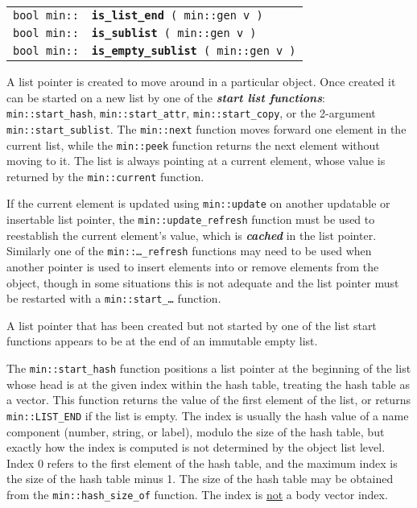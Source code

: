 \documentclass[12pt]{article}
\makeatletter
\newcommand{\skey}[2]{{\bf \em #1#2}\index{#1}}
\newcommand{\ikey}[2]{{\bf \em #1}\index{#2}}
\newcommand{\ttindex}[1]{\index{#1@{\tt #1}}}
\newcommand{\minindex}[1]{\ttindex{min::#1}\ttindex{#1}}
\newcommand{\EOL}{\penalty \exhyphenpenalty}
\newenvironment{indpar}[1][0.3in]%
	{\begin{list}{}%
		     {\setlength{\itemsep}{0in}%
		      \setlength{\topsep}{0in}%
		      \setlength{\parsep}{1ex}%
		      \setlength{\labelwidth}{#1}%
		      \setlength{\leftmargin}{#1}%
		      \addtolength{\leftmargin}{\labelsep}}%
	 \item}%
	{\end{list}}
\newcommand{\LABEL}[1]{\label{#1}}
\newcommand{\MINKEY}[1]{{\tt \bf #1}\minindex{#1}}
\makeatother
\begin{document}
\begin{indpar}\begin{tabular}{r@{}l}
\verb|bool min::|
	& \MINKEY{is\_list\_end}\verb| ( min::gen v )|
\LABEL{MIN::IS_LIST_END} \\
\verb|bool min::|
	& \MINKEY{is\_sublist}\verb| ( min::gen v )|
\LABEL{MIN::IS_SUBLIST} \\
\verb|bool min::|
	& \MINKEY{is\_empty\_sublist}\verb| ( min::gen v )|
\LABEL{MIN::IS_EMPTY_SUBLIST} \\
\end{tabular}\end{indpar}

A list pointer is created to move around in a particular object.
Once created it can be started on a new list by one of the
\skey{start list function}s:
{\tt min::\EOL start\_\EOL hash}, {\tt min::\EOL start\_\EOL attr},
{\tt min::\EOL start\_\EOL copy}, or
the 2-argument {\tt min::\EOL start\_\EOL sublist}.
The {\tt min::\EOL next} function moves forward one element
in the current list,
while the {\tt min::\EOL peek} function returns the next element without
moving to it.
The list is always pointing at a current element, whose value is
returned by the {\tt min::\EOL current} function.

If the current element
is updated using {\tt min::\EOL update}
on another updatable or insertable list pointer,
the {\tt min::\EOL update\_\EOL refresh} function
must be used to reestablish the
current element's value,
which is \ikey{cached}{cache!list pointer}\label{LIST-POINTER-CACHE}
in the list pointer.
Similarly one of the {\tt min::\EOL\ldots\_refresh} functions may
need to be used when another pointer is used to insert elements into
or remove elements
from the object, though in some situations this is
not adequate and the list pointer must be restarted
with a {\tt min::\EOL start\_\dots} function.

A list pointer that has been created but not started by one of the
list start functions appears to be
at the end of an immutable empty list.

The {\tt min::\EOL start\_\EOL hash} function positions
a list pointer at the beginning of the
list whose head is at the given index within the hash table, treating the
hash table as a vector.  This function returns the value of the first
element of the list, or returns {\tt min::\EOL LIST\_\EOL END}
if the list is empty.
The index is usually the hash value of a name component
(number, string, or label),
modulo the size of the hash table,
but exactly how the index is computed is not determined by the object
list level.  Index 0 refers to the first element of the
hash table, and the maximum index is the size of the hash table minus 1.
The size of the hash table may be obtained from the
{\tt min::\EOL hash\_\EOL size\_\EOL of} function.
The index is \underline{not} a body vector index.
\end{document}
